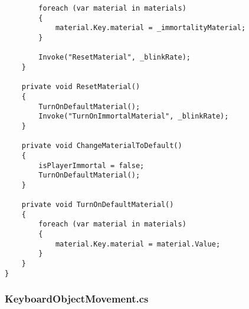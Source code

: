 \begin{verbatim}
        foreach (var material in materials)
        {
            material.Key.material = _immortalityMaterial;
        }

        Invoke("ResetMaterial", _blinkRate);
    }

    private void ResetMaterial()
    {
        TurnOnDefaultMaterial();
        Invoke("TurnOnImmortalMaterial", _blinkRate);
    }

    private void ChangeMaterialToDefault()
    {
        isPlayerImmortal = false;
        TurnOnDefaultMaterial();
    }

    private void TurnOnDefaultMaterial()
    {
        foreach (var material in materials)
        {
            material.Key.material = material.Value;
        }
    }
}
\end{verbatim}
\subsubsection*{KeyboardObjectMovement.cs}

